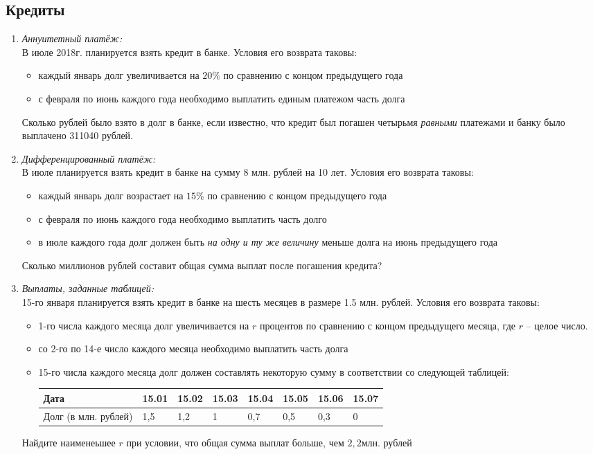 \documentclass[12pt]{article}
\begin{document}
\subsection{Кредиты}
\begin{enumerate}[start=1,label={\itshape\bfseries \arabic*.}]

    \item \emph{Аннуитетный платёж:}\\
    В июле 2018г. планируется взять кредит в банке. Условия его возврата таковы:
    \begin{itemize}
    \item каждый январь долг увеличивается на $20\%$ по сравнению с концом предыдущего года
    \item с февраля по июнь каждого года необходимо выплатить единым платежом часть долга
    \end{itemize}
    Сколько рублей было взято в долг в банке, если известно, что кредит был погашен четырьмя \emph{равными} платежами и банку было выплачено 311040 рублей.
    \item \emph{Дифференцированный платёж:}\\
    В июле планируется взять кредит в банке на сумму 8 млн. рублей на 10 лет. Условия его возврата таковы:
    \begin{itemize}
        \item каждый январь долг возрастает на $15\%$ по сравнению с концом предыдущего года
        \item с февраля по июнь каждого года необходимо выплатить часть долго
        \item в июле каждого года долг должен быть \emph{на одну и ту же величину} меньше долга на июнь предыдущего года
    \end{itemize}
    Сколько миллионов рублей составит общая сумма выплат после погашения кредита?
    \item \emph{Выплаты, заданные таблицей:}\\
    15-го января планируется взять кредит в банке на шесть месяцев в размере 1.5 млн. рублей. Условия его возврата таковы:
    \begin{itemize}
        \item 1-го числа каждого месяца долг увеличивается на $r$ процентов по сравнению с концом предыдущего месяца, где $r$ -- целое число.
        \item со 2-го по 14-е число каждого месяца необходимо выплатить часть долга
        \item 15-го числа каждого месяца долг должен составлять некоторую сумму в соответствии со следующей таблицей:\\
        \begin{tabular}{ | l | l | l | l | l | l | l | l | }
        \hline
        \textbf{Дата} & 15.01 & 15.02 & 15.03 & 15.04 & 15.05 & 15.06 & 15.07\\ \hline
        Долг (в млн. рублей) & 1,5 & 1,2 & 1 & 0,7 & 0,5 & 0,3 & 0\\
        \hline
        \end{tabular}
    \end{itemize}
    Найдите наименеьшее $r$ при условии, что общая сумма выплат больше, чем $2,2$млн. рублей


\end{enumerate}
\end{document}
